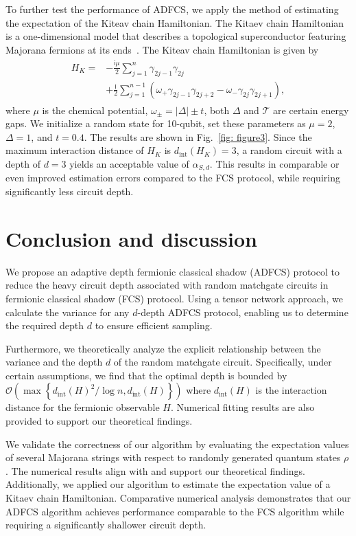\documentclass[showpacs,twocolumn,aps,prx,long bibliography,superscriptaddress,notitlepage]{revtex4-1}
\newcommand{\ii}{\mathsf{i}}
\newcommand{\Ord}[1]{\mathcal{O}\left( #1 \right)}
\newcommand{\Tcal}{\mathcal{T}}
\begin{document}
To further test the performance of ADFCS, we apply the method of estimating the expectation of the Kiteav chain Hamiltonian. The Kitaev chain Hamiltonian is a one-dimensional model that describes a topological superconductor featuring Majorana fermions at its ends~\cite{kitaev2001unpaired}. The Kiteav chain Hamiltonian is given by
\begin{align}
\begin{aligned}
        H_K =& -\frac{\ii \mu}{2} \sum_{j=1}^n \gamma_{2j-1}\gamma_{2j} \\
    &+ \frac{\ii}{2}\sum_{j=1}^{n-1} \left( \omega_+ \gamma_{2j-1}\gamma_{2j+2} - \omega_- \gamma_{2j}\gamma_{2j+1} \right),
\end{aligned}
\end{align}
where $\mu$ is the chemical potential, $\omega_{ \pm}=|\Delta| \pm t$, both $\Delta$ and $\Tcal$ are certain energy gaps. We initialize a random state for 10-qubit, set these parameters as $\mu = 2 $, $\Delta = 1$, and $t=0.4$. The results are shown in Fig.~\ref{fig: figure3}. Since the maximum interaction distance of $H_K$ is $d_\text{int}(H_K) = 3$, a random circuit with a depth of $d = 3$ yields an acceptable value of $\alpha_{S,d}$. This results in comparable or even improved estimation errors compared to the FCS protocol, while requiring significantly less circuit depth.


\section{Conclusion and discussion}
\label{sec: conclusion}

We propose an adaptive depth fermionic classical shadow (ADFCS) protocol to reduce the heavy circuit depth associated with random matchgate circuits in fermionic classical shadow (FCS) protocol. Using a tensor network approach, we calculate the variance for any $d$-depth ADFCS protocol, enabling us to determine the required depth $d$ to ensure efficient sampling. 

Furthermore, we theoretically analyze the explicit relationship between the variance and the depth $d$ of the random matchgate circuit. Specifically, under certain assumptions, we find that the optimal depth is {bounded by} $\Ord{\max\left\{{d_{\text{int}}(H)^2}/{\log n}, d_{\text{int}}(H)\right\}}$ where $d_{\text{int}}(H)$ is the interaction distance for the fermionic observable $H$. Numerical fitting results are also provided to support our theoretical findings.

We validate the correctness of our algorithm by evaluating the expectation values of several Majorana strings with respect to randomly generated quantum states $\rho$. The numerical results align with and support our theoretical findings. Additionally, we applied our algorithm to estimate the expectation value of a Kitaev chain Hamiltonian. Comparative numerical analysis demonstrates that our ADFCS algorithm achieves performance comparable to the FCS algorithm while requiring a significantly shallower circuit depth.
\end{document}
